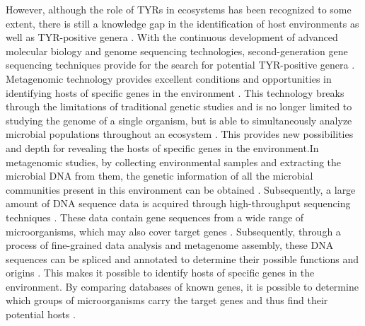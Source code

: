 \documentclass[12pt]{article}
\begin{document}
However, although the role of TYRs in ecosystems has been recognized to some extent, there is still a knowledge gap in the identification of host environments as well as TYR-positive genera \citep{panis2022novel}. With the continuous development of advanced molecular biology and genome sequencing technologies, second-generation gene sequencing techniques provide for the search for potential TYR-positive genera \citep{slatko2018overview,metzker2010sequencing}. Metagenomic technology provides excellent conditions and opportunities in identifying hosts of specific genes in the environment \citep{wooley2010primer,sleator2008metagenomics}. This technology breaks through the limitations of traditional genetic studies and is no longer limited to studying the genome of a single organism, but is able to simultaneously analyze microbial populations throughout an ecosystem \citep{metzker2010sequencing,wooley2010primer,sleator2008metagenomics}. This provides new possibilities and depth for revealing the hosts of specific genes in the environment.In metagenomic studies, by collecting environmental samples and extracting the microbial DNA from them, the genetic information of all the microbial communities present in this environment can be obtained \citep{wooley2010primer}. Subsequently, a large amount of DNA sequence data is acquired through high-throughput sequencing techniques \citep{daniel2005metagenomics}. These data contain gene sequences from a wide range of microorganisms, which may also cover target genes \citep{daniel2005metagenomics}. Subsequently, through a process of fine-grained data analysis and metagenome assembly, these DNA sequences can be spliced and annotated to determine their possible functions and origins \citep{daniel2005metagenomics,sleator2008metagenomics}. This makes it possible to identify hosts of specific genes in the environment. By comparing databases of known genes, it is possible to determine which groups of microorganisms carry the target genes and thus find their potential hosts \citep{metzker2010sequencing}.\\\\
\end{document}
